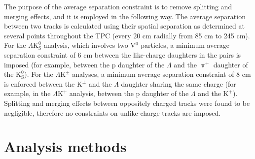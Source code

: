 \documentclass[ALICE,manyauthors]{cernphprep}
\newcommand{\Lam}{$\Lambda$\xspace}
\newcommand{\KchP}{$\mathrm{K^{+}}$\xspace}
\newcommand{\Kpm}{$\mathrm{K^{\pm}}$\xspace}
\newcommand{\Ks}{$\mathrm{K^{0}_{S}}$\xspace}
\newcommand{\LamKchP}{$\Lambda\mathrm{K^{+}}$\xspace}
\newcommand{\LamKpm}{$\Lambda\mathrm{K^{\pm}}$\xspace}
\newcommand{\LamKs}{$\Lambda\mathrm{K^{0}_{S}}$\xspace}
\newcommand{\Vz}{V$^{0}$\xspace}
\begin{document}
The purpose of the average separation constraint is to remove splitting and merging effects, and it is employed in the following way.  
The average separation between two tracks is calculated using their spatial separation as determined at several points throughout the TPC (every 20 cm radially from 85 cm to 245 cm).
For the \LamKs analysis, which involves two \Vz particles, a minimum average separation constraint of 6 cm between the like-charge daughters in the pairs is imposed (for example, between the p daughter of the \Lam and the $\uppi^{+}$ daughter of the \Ks).
For the \LamKpm analyses, a minimum average separation constraint of 8 cm is enforced between the \Kpm and the \Lam daughter sharing the same charge (for example, in the \LamKchP analysis, between the p daughter of the \Lam and the \KchP).
Splitting and merging effects between oppositely charged tracks were found to be negligible, therefore no constraints on unlike-charge tracks are imposed.

\section{Analysis methods}
\label{sec:AnalysisMethods}

\end{document}

